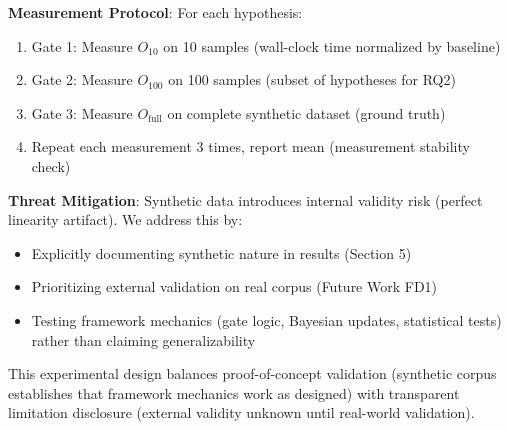 \textbf{Measurement Protocol}: For each hypothesis:
\begin{enumerate}
\item Gate 1: Measure $O_{10}$ on 10 samples (wall-clock time normalized by baseline)
\item Gate 2: Measure $O_{100}$ on 100 samples (subset of hypotheses for RQ2)
\item Gate 3: Measure $O_{\text{full}}$ on complete synthetic dataset (ground truth)
\item Repeat each measurement 3 times, report mean (measurement stability check)
\end{enumerate}

\textbf{Threat Mitigation}: Synthetic data introduces internal validity risk (perfect linearity artifact). We address this by:
\begin{itemize}
\item Explicitly documenting synthetic nature in results (Section 5)
\item Prioritizing external validation on real corpus (Future Work FD1)
\item Testing framework mechanics (gate logic, Bayesian updates, statistical tests) rather than claiming generalizability
\end{itemize}

This experimental design balances proof-of-concept validation (synthetic corpus establishes that framework mechanics work as designed) with transparent limitation disclosure (external validity unknown until real-world validation).

